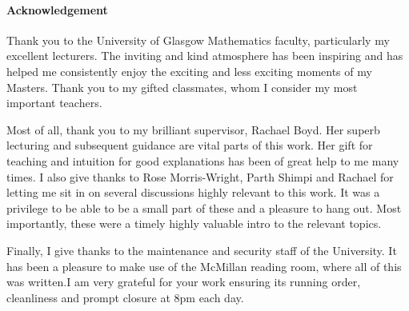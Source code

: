 \documentclass[class=article, crop=false]{standalone}
\begin{document}
\paragraph{Acknowledgement}
Thank you to the University of Glasgow Mathematics faculty, particularly my excellent lecturers. The inviting and kind atmosphere has been inspiring and has helped me consistently enjoy the exciting and less exciting moments of my Masters. Thank you to my gifted classmates, whom I consider my most important teachers.

Most of all, thank you to my brilliant supervisor, Rachael Boyd. Her superb lecturing and subsequent guidance are vital parts of this work. Her gift for teaching and intuition for good explanations has been of great help to me many times. I also give thanks to Rose Morris-Wright, Parth Shimpi and Rachael for letting me sit in on several discussions highly relevant to this work. It was a privilege to be able to be a small part of these and a pleasure to hang out. Most importantly, these were a timely highly valuable intro to the relevant topics.

Finally, I give thanks to the maintenance and security staff of the University. It has been a pleasure to make use of the McMillan reading room, where all of this was written.I am very grateful for your work ensuring its running order, cleanliness and prompt closure at 8pm each day.
\end{document}
